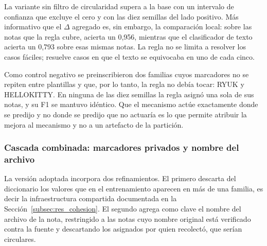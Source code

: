 \begin{table}[ht]
\centering
\caption{Cascada de marcadores hacia el clasificador de texto (149 notas, P2, 10 semillas)}
\label{tab:cascada_ioc}
\end{table}

La variante sin filtro de circularidad supera a la base con un intervalo de confianza que excluye el cero y con las diez semillas del lado positivo. Más informativo que el $\Delta$ agregado es, sin embargo, la comparación local: sobre las notas que la regla cubre, acierta un 0,956, mientras que el clasificador de texto acierta un 0,793 sobre esas mismas notas. La regla no se limita a resolver los casos fáciles; resuelve casos en que el texto se equivocaba en uno de cada cinco.

Como control negativo se preinscribieron dos familias cuyos marcadores no se repiten entre plantillas y que, por lo tanto, la regla no debía tocar: RYUK y HELLOKITTY. En ninguna de las diez semillas la regla asignó una sola de sus notas, y su F1 se mantuvo idéntico. Que el mecanismo actúe exactamente donde se predijo y no donde se predijo que no actuaría es lo que permite atribuir la mejora al mecanismo y no a un artefacto de la partición.

\subsubsection*{Cascada combinada: marcadores privados y nombre del archivo}

La versión adoptada incorpora dos refinamientos. El primero descarta del diccionario los valores que en el entrenamiento aparecen en más de una familia, es decir la infraestructura compartida documentada en la Sección~\ref{subsec:res_cohesion}. El segundo agrega como clave el nombre del archivo de la nota, restringido a las notas cuyo nombre original está verificado contra la fuente y descartando los asignados por quien recolectó, que serían circulares.

